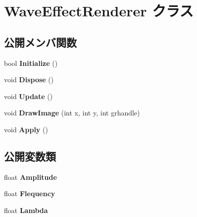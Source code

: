 \hypertarget{class_wave_effect_renderer}{}\section{Wave\+Effect\+Renderer クラス}
\label{class_wave_effect_renderer}
\subsection*{公開メンバ関数}
\begin{DoxyCompactItemize}
\item 
bool {\bfseries Initialize} ()\hypertarget{class_wave_effect_renderer_ae9d94b1c1c8047868a32144f2052a735}{}\label{class_wave_effect_renderer_ae9d94b1c1c8047868a32144f2052a735}

\item 
void {\bfseries Dispose} ()\hypertarget{class_wave_effect_renderer_ab45a93ca01afa67c4e4c8d8c500ae631}{}\label{class_wave_effect_renderer_ab45a93ca01afa67c4e4c8d8c500ae631}

\item 
void {\bfseries Update} ()\hypertarget{class_wave_effect_renderer_a665353af26f7e7d47ca9b587444a0c27}{}\label{class_wave_effect_renderer_a665353af26f7e7d47ca9b587444a0c27}

\item 
void {\bfseries Draw\+Image} (int x, int y, int grhandle)\hypertarget{class_wave_effect_renderer_a5fd9f788899e6736f5fcc24bc7e70920}{}\label{class_wave_effect_renderer_a5fd9f788899e6736f5fcc24bc7e70920}

\item 
void {\bfseries Apply} ()\hypertarget{class_wave_effect_renderer_a02c5ce0e2d1d6fe89d59277170ebb427}{}\label{class_wave_effect_renderer_a02c5ce0e2d1d6fe89d59277170ebb427}

\end{DoxyCompactItemize}
\subsection*{公開変数類}
\begin{DoxyCompactItemize}
\item 
float {\bfseries Amplitude}\hypertarget{class_wave_effect_renderer_a5f5e93843e548baece62cdf8611befa7}{}\label{class_wave_effect_renderer_a5f5e93843e548baece62cdf8611befa7}

\item 
float {\bfseries Flequency}\hypertarget{class_wave_effect_renderer_a99a6c207d5300d1d7e36b6404904ebfe}{}\label{class_wave_effect_renderer_a99a6c207d5300d1d7e36b6404904ebfe}

\item 
float {\bfseries Lambda}\hypertarget{class_wave_effect_renderer_af31bfa2bd5ee32518c0e7d538035e81c}{}\label{class_wave_effect_renderer_af31bfa2bd5ee32518c0e7d538035e81c}

\end{DoxyCompactItemize}



